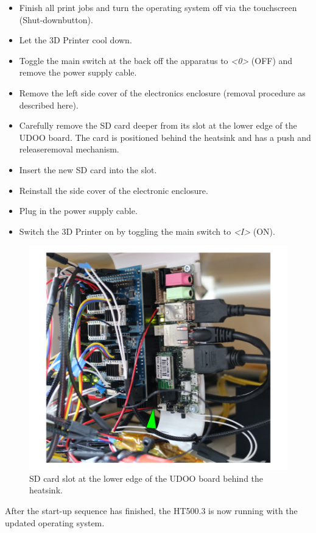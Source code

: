 \begin{itemize}
  \item Finish all print jobs and turn the operating system off 
        via the touchscreen (\lbrack Shut-down\rbrack  button).
  \item Let the 3D Printer cool down.
  \item Toggle the main switch at the back off the apparatus to \emph{<0>} (OFF) and 
        remove the power supply cable.
  \item Remove the left side cover of the electronics enclosure (removal procedure as described here).
  \item Carefully remove the SD card deeper from its slot at the lower edge of the UDOO board. 
        The card is positioned behind the heatsink and has a \dq push and release\dq removal mechanism.
  \item Insert the new SD card into the slot.
  \item Reinstall the side cover of the electronic enclosure.
  \item Plug in the power supply cable.
  \item Switch the 3D Printer on by toggling the main switch to \emph{<I>} (ON).
\end{itemize}

\begin{figure}[H]
  \centering
  \includegraphics[width=.7\linewidth]{./img/sg_sd-card_removal.png}
  \caption{SD card slot at the lower edge of the UDOO board behind the heatsink.}
\end{figure}

After the start-up sequence has finished, the HT500.3 is now running with the updated operating system. 
